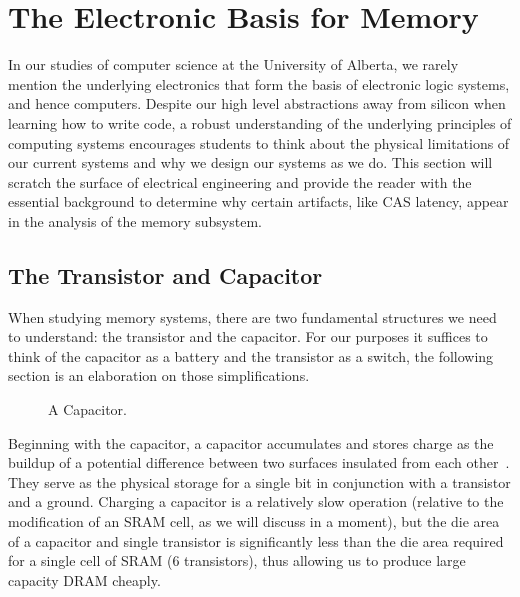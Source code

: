 \chapter{The Electronic Basis for Memory}

In our studies of computer science at the University of Alberta, we rarely mention the underlying electronics that form the basis of electronic logic systems, and hence computers. Despite our high level abstractions away from silicon when learning how to write code, a robust understanding of the underlying principles of computing systems encourages students to think about the physical limitations of our current systems and why we design our systems as we do. This section will scratch the surface of electrical engineering and provide the reader with the essential background to determine why certain artifacts, like CAS latency, appear in the analysis of the memory subsystem.

\section{The Transistor and Capacitor}

When studying memory systems, there are two fundamental structures we need to understand: the transistor and the capacitor. For our purposes it suffices to think of the capacitor as a battery and the transistor as a switch, the following section is an elaboration on those simplifications.

\begin{figure}
  \centering
  \caption{A Capacitor.}
\end{figure}
Beginning with the capacitor, a capacitor accumulates and stores charge as the buildup of a potential difference between two surfaces insulated from each other~\cite{wiki:capacitor}. They serve as the physical storage for a single bit in conjunction with a transistor and a ground. Charging a capacitor is a relatively slow operation (relative to the modification of an SRAM cell, as we will discuss in a moment), but the die area of a capacitor and single transistor is significantly less than the die area required for a single cell of SRAM (6 transistors), thus allowing us to produce large capacity DRAM cheaply.

